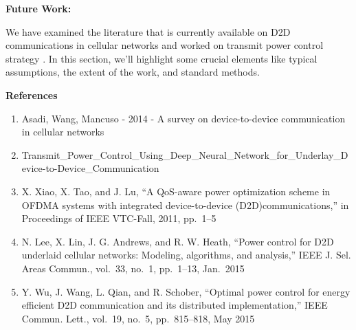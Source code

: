 \documentclass[12pt,a4paper,twoside]{article}
\newcommand{\hone}[1]{%
  \begingroup\setlength{\parskip}{0pt}%
  {\fontsize{18pt}{21.6pt}\selectfont\bfseries #1}\par\nopagebreak
  \endgroup}
\newcommand{\us}{\_\allowbreak{}}
\begin{document}
\newpage
\hone{Future Work:}
\noindent We have examined the literature that is currently available on D2D communications in cellular networks and worked on transmit power control strategy . In this section, we'll highlight some crucial elements like typical assumptions, the extent of the work, and standard methods.\par

\newpage
\hone{References}
\begin{enumerate}[leftmargin=0.5in,labelindent=0pt,labelwidth=0.25in,labelsep=0pt,
                  itemsep=0pt,parsep=0pt,topsep=0pt,partopsep=0pt,align=left]
\item Asadi, Wang, Mancuso - 2014 - A survey on device-to-device communication in cellular networks
\item Transmit\us Power\us Control\us Using\us Deep\us Neural\us Network\us for\us Underlay\us Device-to-Device\us Communication
\item X. Xiao, X. Tao, and J. Lu, ``A QoS-aware power optimization scheme in OFDMA systems with integrated device-to-device (D2D)communications,'' in Proceedings of IEEE VTC-Fall, 2011, pp.~1--5
\item N. Lee, X. Lin, J. G. Andrews, and R. W. Heath, ``Power control for D2D underlaid cellular networks: Modeling, algorithms, and analysis,'' IEEE J. Sel. Areas Commun., vol.~33, no.~1, pp.~1--13, Jan.\ 2015
\item Y. Wu, J. Wang, L. Qian, and R. Schober, ``Optimal power control for energy efficient D2D communication and its distributed implementation,'' IEEE Commun. Lett., vol.~19, no.~5, pp.~815--818, May 2015
\end{enumerate}
\end{document}
